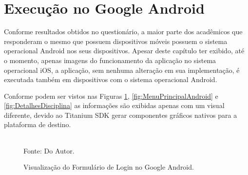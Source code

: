 \section{Execução no Google Android}
Conforme resultados obtidos no questionário, a maior parte dos acadêmicos que responderam o mesmo que possuem dispositivos móveis possuem o sistema operacional Android nos seus dispositivos. Apesar deste capítulo ter exibido, até o momento, apenas imagens do funcionamento da aplicação no sistema operacional iOS, a aplicação, sem nenhuma alteração em sua implementação, é executada também em dispositivos com o sistema operacional Android.

Conforme podem ser vistos nas Figuras \ref{fig:LoginAndroid}, \ref{fig:MenuPrincipalAndroid} e \ref{fig:DetalhesDisciplina} as informações são exibidas apenas com um visual diferente, devido ao Titanium SDK gerar componentes gráficos nativos para a plataforma de destino.

\begin{figure}[!htb]
     \centering
     \caption[Formulário de Login - Google Android]{Visualização do Formulário de Login no Google Android.}
     \label{fig:LoginAndroid}
     \\  Fonte: Do Autor.
\end{figure}

